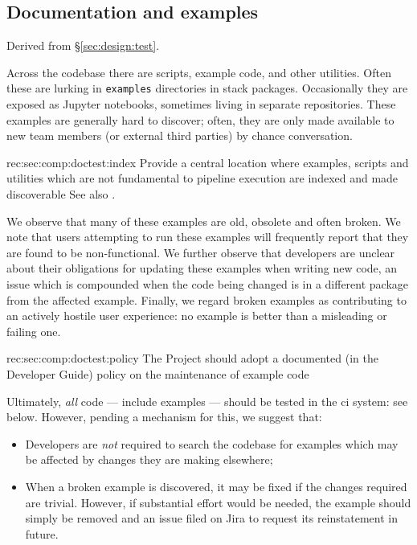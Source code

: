 \subsection{Documentation and examples}
\label{sec:comp:doctest}

Derived from \S\ref{sec:design:test}.

Across the codebase there are scripts, example code, and other utilities.
Often these are lurking in \texttt{examples} directories in stack packages.
Occasionally they are exposed as Jupyter notebooks, sometimes living in separate repositories.
These examples are generally hard to discover; often, they are only made available to new team members (or external third parties) by chance conversation.

\begin{recommendation}
    {rec:sec:comp:doctest:index}
    {Provide a central location where examples, scripts and utilities which are not fundamental to pipeline execution are indexed and made discoverable}
See also .
\end{recommendation}

We observe that many of these examples are old, obsolete and often broken.
We note that users attempting to run these examples will frequently report that they are found to be non-functional.
We further observe that developers are unclear about their obligations for updating these examples when writing new code, an issue which is compounded when the code being changed is in a different package from the affected example.
Finally, we regard broken examples as contributing to an actively hostile user experience: no example is better than a misleading or failing one.

\begin{recommendation}
    {rec:sec:comp:doctest:policy}
    {The Project should adopt a documented (in the Developer Guide) policy on the maintenance of example code}
\end{recommendation}

Ultimately, \emph{all} code --- include examples --- should be tested in the \gls{ci} system: see below.
However, pending a mechanism for this, we suggest that:

\begin{itemize}
    \item{Developers are \textit{not} required to search the codebase for examples which may be affected by changes they are making elsewhere;}
    \item{
        When a broken example is discovered, it may be fixed if the changes required are trivial.
        However, if substantial effort would be needed, the example should simply be removed and an issue filed on Jira to request its reinstatement in future.
    }
\end{itemize}

